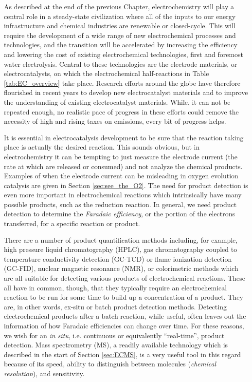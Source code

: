 As described at the end of the previous Chapter, electrochemistry will play a central role in a steady-state civilization where all of the inputs to our energy infrastructure and chemical industries are renewable or closed-cycle. This will require the development of a wide range of new electrochemical processes and technologies, and the transition will be accelerated by increasing the efficiency and lowering the cost of existing electrochemical technologies, first and foremost water electrolysis. Central to these technologies are the electrode materials, or electrocatalysts, on which the electrochemical half-reactions in Table \ref{tab:EC_overview} take place. Research efforts around the globe have therefore flourished in recent years to develop new electrocatalyst materials and to improve the understanding of existing electrocatalyst materials. While, it can not be repeated enough, no realistic pace of progress in these efforts could remove the necessity of high and rising taxes on  emissions, every bit of progress helps.

It is essential in electrocatalysis development to be sure that the reaction taking place is actually the desired reaction. This sounds obvious, but in electrochemistry it can be tempting to just measure the electrode current (the rate at which  are released or consumed) and not analyze the chemical products. Examples of when the electrode current can be misleading in oxygen evolution catalysis are given in Section \ref{sec:see_the_O2}. The need for product detection is even more important in electrochemical reactions which intrinsically have many possible products, such as the  reduction reaction\cite{Nitopi2019}. In general, we need product detection to determine the \textit{Faradaic efficiency}, or the portion of the electrons transferred, for a specific reaction or product.

There are a number of product quantification methods including, for example, high pressure liquid chromatography (HPLC), gas chromatography coupled to temperature conductivity detection (GC-TCD) or flame ionization detection (GC-FID), nuclear magnetic resonance (NMR), or colorimetric methods which are all suitable for detecting various products of electrochemical reactions. These all have in common, though, that they typically require an electrochemical reaction to be run for some time to build up a concentration of a product. They are, in other words, ex-situ or batch product detection methods. Detecting electrochemical products after a batch reaction, while useful, often leaves out the information of how Faradaic efficiencies can change over time. For these reasons, we wish for an \textit{in situ}, i.e. continuous or equivalently ``real-time'', product detection. Mass spectrometry (MS), a readily available technology which is described in the start of Section \ref{sec:ECMS}, is a very useful tool in this regard because of its speed, ability to distinguish between molecules (\textit{chemical resolution}), and sensitivity.

